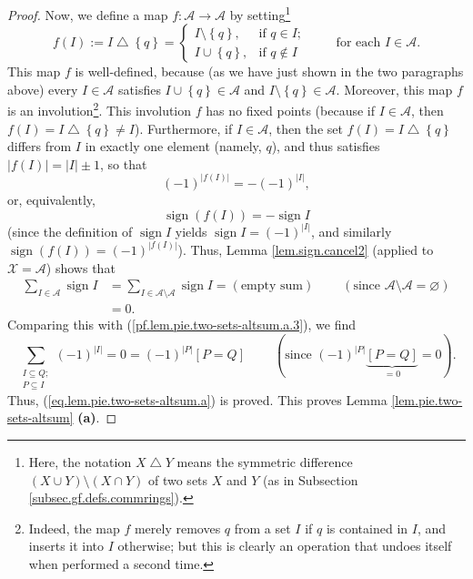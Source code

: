 \begin{proof}
Now, we define a map $f:\mathcal{A}\rightarrow\mathcal{A}$ by
setting\footnote{Here, the notation $X\bigtriangleup Y$ means the symmetric
difference $\left(  X\cup Y\right)  \setminus\left(  X\cap Y\right)  $ of two
sets $X$ and $Y$ (as in Subsection \ref{subsec.gf.defs.commrings}).}%
\[
f\left(  I\right)  :=I\bigtriangleup\left\{  q\right\}  =%
\begin{cases}
I\setminus\left\{  q\right\}  , & \text{if }q\in I;\\
I\cup\left\{  q\right\}  , & \text{if }q\notin I
\end{cases}
\ \ \ \ \ \ \ \ \ \ \text{for each }I\in\mathcal{A}.
\]
This map $f$ is well-defined, because (as we have just shown in the two
paragraphs above) every $I\in\mathcal{A}$ satisfies $I\cup\left\{  q\right\}
\in\mathcal{A}$ and $I\setminus\left\{  q\right\}  \in\mathcal{A}$. Moreover,
this map $f$ is an involution\footnote{Indeed, the map $f$ merely removes $q$
from a set $I$ if $q$ is contained in $I$, and inserts it into $I$ otherwise;
but this is clearly an operation that undoes itself when performed a second
time.}. This involution $f$ has no fixed points (because if $I\in\mathcal{A}$,
then $f\left(  I\right)  =I\bigtriangleup\left\{  q\right\}  \neq I$).
Furthermore, if $I\in\mathcal{A}$, then the set $f\left(  I\right)
=I\bigtriangleup\left\{  q\right\}  $ differs from $I$ in exactly one element
(namely, $q$), and thus satisfies $\left\vert f\left(  I\right)  \right\vert
=\left\vert I\right\vert \pm1$, so that%
\[
\left(  -1\right)  ^{\left\vert f\left(  I\right)  \right\vert }=-\left(
-1\right)  ^{\left\vert I\right\vert },
\]
or, equivalently,%
\[
\operatorname*{sign}\left(  f\left(  I\right)  \right)  =-\operatorname*{sign}%
I
\]
(since the definition of $\operatorname*{sign}I$ yields $\operatorname*{sign}%
I=\left(  -1\right)  ^{\left\vert I\right\vert }$, and similarly
$\operatorname*{sign}\left(  f\left(  I\right)  \right)  =\left(  -1\right)
^{\left\vert f\left(  I\right)  \right\vert }$). Thus, Lemma
\ref{lem.sign.cancel2} (applied to $\mathcal{X}=\mathcal{A}$) shows that%
\begin{align*}
\sum_{I\in\mathcal{A}}\operatorname*{sign}I  &  =\sum_{I\in\mathcal{A}%
\setminus\mathcal{A}}\operatorname*{sign}I=\left(  \text{empty sum}\right)
\ \ \ \ \ \ \ \ \ \ \left(  \text{since }\mathcal{A}\setminus\mathcal{A}%
=\varnothing\right) \\
&  =0.
\end{align*}
Comparing this with (\ref{pf.lem.pie.two-sets-altsum.a.3}), we find%
\[
\sum_{\substack{I\subseteq Q;\\P\subseteq I}}\left(  -1\right)  ^{\left\vert
I\right\vert }=0=\left(  -1\right)  ^{\left\vert P\right\vert }\left[
P=Q\right]  \ \ \ \ \ \ \ \ \ \ \left(  \text{since }\left(  -1\right)
^{\left\vert P\right\vert }\underbrace{\left[  P=Q\right]  }_{=0}=0\right)  .
\]
Thus, (\ref{eq.lem.pie.two-sets-altsum.a}) is proved. This proves Lemma
\ref{lem.pie.two-sets-altsum} \textbf{(a)}. \medskip


\end{proof}
